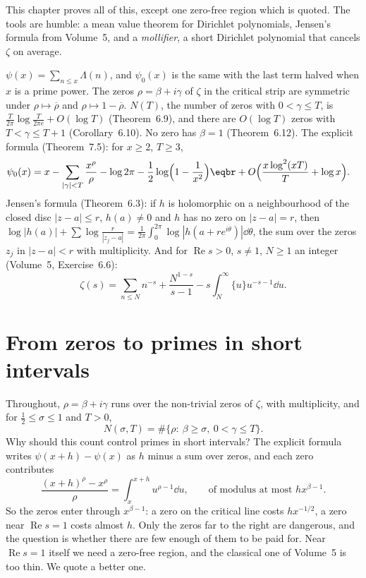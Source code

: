 This chapter proves all of this, except one zero-free region which is quoted. The tools are humble: a mean value theorem for Dirichlet polynomials, Jensen's formula from Volume~5, and a \emph{mollifier}, a short Dirichlet polynomial that cancels $\zeta$ on average.

\begin{reminder}
$\psi(x)=\sum_{n\le x}\Lambda(n)$, and $\psi_0(x)$ is the same with the last term halved when $x$ is a prime power. The zeros $\rho=\beta+i\gamma$ of $\zeta$ in the critical strip are symmetric under $\rho\mapsto\overline\rho$ and $\rho\mapsto1-\overline\rho$. $N(T)$, the number of zeros with $0<\gamma\le T$, is
$\frac T{2\pi}\log\frac T{2\pi e}+O(\log T)$ (Theorem~6.9), and there are $O(\log T)$ zeros with $T<\gamma\le T+1$ (Corollary~6.10). No zero has $\beta=1$ (Theorem~6.12). The explicit formula (Theorem~7.5): for $x\ge2$, $T\ge3$,
\[
\begin{aligned}\psi_0(x)&=x-\sum_{|\gamma|<T}\frac{x^\rho}\rho-\log2\pi-\frac12\log\Bigl(1-\frac1{x^2}\Bigr)\eqbr+O\Bigl(\frac{x\log^2(xT)}T+\log x\Bigr).\end{aligned}
\]
Jensen's formula (Theorem~6.3): if $h$ is holomorphic on a neighbourhood of the closed disc $|z-a|\le r$, $h(a)\ne0$ and $h$ has no zero on $|z-a|=r$, then $\log|h(a)|+\sum\log\frac r{|z_j-a|}=\frac1{2\pi}\int_0^{2\pi}\log|h(a+re^{i\theta})|\dd\theta$, the sum over the zeros $z_j$ in $|z-a|<r$ with multiplicity.
And for $\operatorname{Re}s>0$, $s\ne1$, $N\ge1$ an integer (Volume~5, Exercise~6.6):
\[
\zeta(s)=\sum_{n\le N}n^{-s}+\frac{N^{1-s}}{s-1}-s\int_N^\infty\{u\}u^{-s-1}\dd u.
\]
\end{reminder}

\section{From zeros to primes in short intervals}

Throughout, $\rho=\beta+i\gamma$ runs over the non-trivial zeros of $\zeta$, with multiplicity, and for $\frac12\le\sigma\le1$ and $T>0$,
\[
N(\sigma,T)=\#\{\rho:\ \beta\ge\sigma,\ 0<\gamma\le T\}.
\]
Why should this count control primes in short intervals? The explicit formula writes $\psi(x+h)-\psi(x)$ as $h$ minus a sum over zeros, and each zero contributes
\[
\frac{(x+h)^\rho-x^\rho}\rho=\int_x^{x+h}u^{\rho-1}\dd u,\qquad\text{of modulus at most }hx^{\beta-1}.
\]
So the zeros enter through $x^{\beta-1}$: a zero on the critical line costs $hx^{-1/2}$, a zero near $\operatorname{Re}s=1$ costs almost $h$. Only the zeros far to the right are dangerous, and the question is whether there are few enough of them to be paid for. Near $\operatorname{Re}s=1$ itself we need a zero-free region, and
the classical one of Volume~5 is too thin. We quote a better one.

